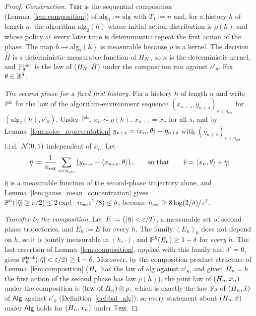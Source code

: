 \begin{proof}
\leanok
{}
\emph{Construction.} $\mathsf{Test}$ is the sequential composition (Lemma~\ref{lem:composition})
of $\mathrm{alg}_1 := \mathrm{alg}$ with $T_1 := n$ and, for a history $h$ of length $n$, the
algorithm $\mathrm{alg}_2(h)$ whose initial action distribution is $\rho(h)$ and whose policy
at every later time is deterministic: repeat the first action of the phase. The map
$h \mapsto \mathrm{alg}_2(h)$ is measurable because $\rho$ is a kernel. The decision
$\hat H$ is a deterministic measurable function of $H_N$, so $\kappa$ is the
deterministic kernel, and $\mathbb{P}^{\mathrm{test}}_\theta$ is the law of $(H_N,\hat H)$ under
the composition run against $\nu'_\theta$. Fix $\theta \in \mathbb{R}^d$.

\emph{The second phase for a fixed first history.} Fix a history $h$ of length $n$ and write
$\mathbb{P}^{h}$ for the law of the algorithm-environment sequence
$(x_{n+s}, y_{n+s})_{s < n_{\mathrm{est}}}$ for $(\mathrm{alg}_2(h), \nu'_\theta)$. Under
$\mathbb{P}^{h}$, $x_n \sim \rho(h)$, $x_{n+s} = x_n$ for all $s$, and by
Lemma~\ref{lem:noise_representation} $y_{n+s} = \langle x_n, \theta \rangle + \eta_{n+s}$ with
$(\eta_{n+s})_{s<n_{\mathrm{est}}}$ i.i.d.\ $\mathcal{N}(0,1)$ independent of $x_n$. Let
\[
  \bar\eta := \frac{1}{n_{\mathrm{est}}}\sum_{s < n_{\mathrm{est}}}\big(y_{n+s} - \langle x_{n+s}, \theta \rangle\big),
  \qquad\text{so that}\qquad \hat v = \langle x_n, \theta \rangle + \bar\eta ;
\]
$\bar\eta$ is a measurable function of the second-phase trajectory alone, and
Lemma~\ref{lem:gauss_mean_concentration} gives
$\mathbb{P}^{h}(\lvert \bar\eta \rvert \ge \varepsilon/2) \le 2\exp(-n_{\mathrm{est}}\varepsilon^2/8) \le \delta$, because
$n_{\mathrm{est}} \ge 8\log(2/\delta)/\varepsilon^2$.

\emph{Transfer to the composition.} Let $E := \{\lvert \bar\eta \rvert < \varepsilon/2\}$, a measurable set of
second-phase trajectories, and $E_h := E$ for every $h$. The family $(E_h)_h$ does not depend on
$h$, so it is jointly measurable in $(h,\cdot)$, and $\mathbb{P}^{h}(E_h) \ge 1 - \delta$ for
\emph{every} $h$. The last assertion of Lemma~\ref{lem:composition}, applied with this family
and $\delta' = 0$, gives $\mathbb{P}^{\mathrm{test}}_\theta(\lvert \bar\eta \rvert < \varepsilon/2) \ge 1 - \delta$.
Moreover, by the composition-product structure of Lemma~\ref{lem:composition} ($H_n$ has the
law of $\mathrm{alg}$ against $\nu'_\theta$, and given $H_n = h$ the first action of the
second phase has law $\rho(h)$), the joint law of $(H_n, x_n)$ under the composition is
$(\text{law of } H_n)\otimes\rho$, which is exactly the law $\mathbb{P}_\theta$ of $(H_n,\hat{x})$
of $\mathsf{Alg}$ against $\nu'_\theta$ (Definition~\ref{def:bai_alg}); so every statement about
$(H_n,\hat{x})$ under $\mathsf{Alg}$ holds for $(H_n, x_n)$ under $\mathsf{Test}$.


\end{proof}
